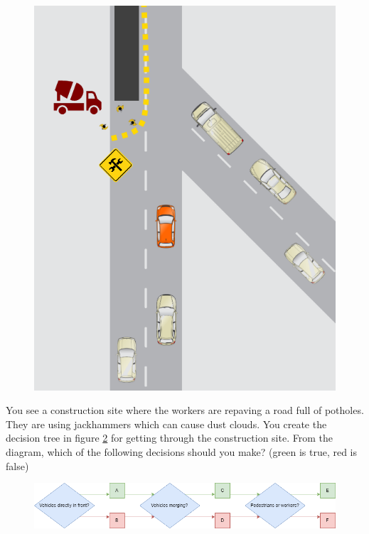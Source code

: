 \begin{enumerate}
\begin{figure}[!htb]
\begin{center}
\includegraphics[scale=0.280]{img/intro_self_driving/summary_question_scenario_4.png}
\end{center}
\label{summary_question_scenario_4}
\end{figure}

You see a construction site where the workers are repaving a road full of potholes. They are using jackhammers which can cause dust clouds.
You create the  decision tree in figure \ref{summary_question_scenario_4_flowchart} for getting through the construction site. 
From the diagram, which of the following decisions should you make? (green is true, red is false) 

\begin{figure}[!htb]
\begin{center}
\includegraphics[scale=0.280]{img/intro_self_driving/summary_question_scenario_4_flowchart.png}
\end{center}
\label{summary_question_scenario_4_flowchart}
\end{figure}


\end{enumerate}
